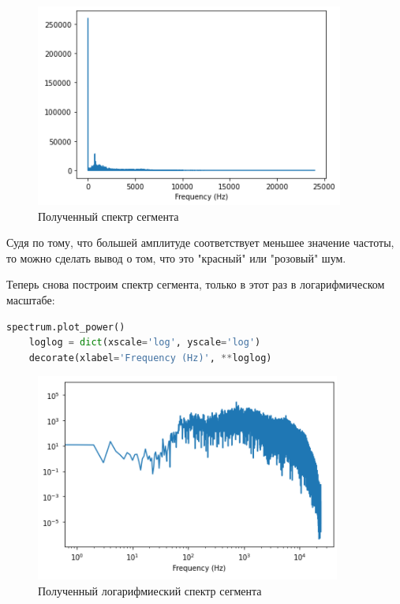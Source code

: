 \documentclass[a4paper]{article}
\begin{document}
            \begin{figure}[H]
                \centering
                \includegraphics{ex_1_rain_spectr.png}
                \caption{Полученный спектр сегмента}
                \label{fig:ex_1_rain_spectr}
            \end{figure}
            
            Судя по тому, что большей амплитуде соответствует меньшее значение  частоты, то можно сделать вывод о том, что это "красный" или "розовый" шум.
            
            Теперь снова построим спектр сегмента, только в этот раз в логарифмическом масштабе:
            
\begin{lstlisting}[language=Python, caption= Получение логарифмиеского спектра сегмента]
    spectrum.plot_power()
    loglog = dict(xscale='log', yscale='log')
    decorate(xlabel='Frequency (Hz)', **loglog)
\end{lstlisting}               
            
            \begin{figure}[H]
                \centering
                \includegraphics{ex_1_rain_log_spectr.png}
                \caption{Полученный логарифмиеский спектр сегмента}
                \label{fig:ex_1_rain_log_spectr}
            \end{figure}
            
\end{document}
